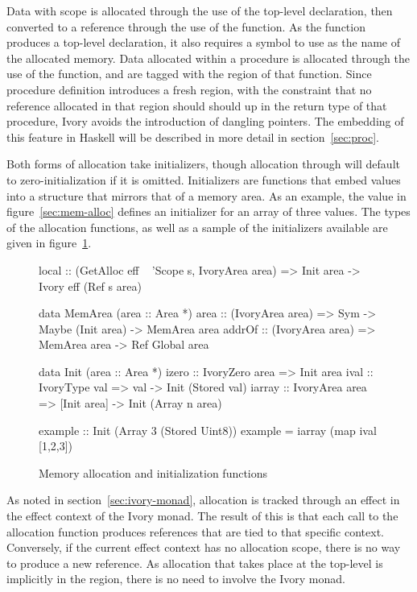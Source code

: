 Data with  scope is allocated through the use of the 
top-level declaration, then converted to a reference through the use of the
 function.  As the  function produces a top-level
declaration, it also requires a symbol to use as the name of the allocated
memory.  Data allocated within a procedure is allocated through the use of the
 function, and are tagged with the region of that function.  Since
procedure definition introduces a fresh region, with the constraint that no
reference allocated in that region should should up in the return type of that
procedure, Ivory avoids the introduction of dangling pointers.  The embedding of
this feature in Haskell will be described in more detail in
section~\ref{sec:proc}.

Both forms of allocation take initializers, though  allocation
through  will default to zero-initialization if it is omitted.
Initializers are functions that embed values into a structure that mirrors that
of a memory area.  As an example, the  value in
figure~\ref{sec:mem-alloc} defines an initializer for an array of three
 values.  The types of the allocation functions, as well as a sample
of the initializers available are given in figure~\ref{fig:mem-alloc}.

\begin{figure}
\begin{code}
local  :: (GetAlloc eff ~ 'Scope s, IvoryArea area)
       => Init area -> Ivory eff (Ref s area)

data MemArea (area :: Area *)
area   :: (IvoryArea area)
       => Sym -> Maybe (Init area) -> MemArea area
addrOf :: (IvoryArea area)
       => MemArea area -> Ref Global area

data Init (area :: Area *)
izero  :: IvoryZero area => Init area
ival   :: IvoryType val  => val -> Init (Stored val)
iarray :: IvoryArea area
       => [Init area] -> Init (Array n area)

example :: Init (Array 3 (Stored Uint8))
example  = iarray (map ival [1,2,3])
\end{code}
\caption{Memory allocation and initialization functions}
\label{fig:mem-alloc}
\end{figure}

As noted in section~\ref{sec:ivory-monad}, allocation is tracked through an
effect in the effect context of the Ivory monad.  The result of this is that
each call to the  allocation function produces references that are
tied to that specific context.  Conversely, if the current effect context has
no allocation scope, there is no way to produce a new reference.  As allocation
that takes place at the top-level is implicitly in the  region, there
is no need to involve the Ivory monad.

